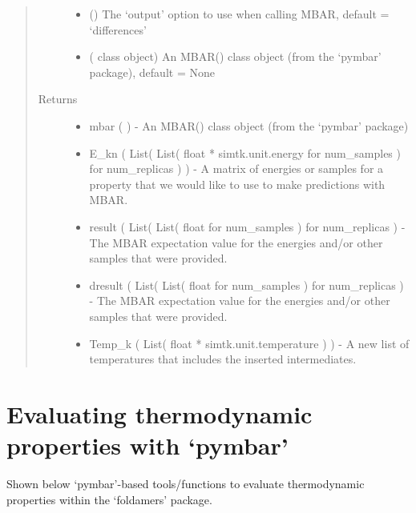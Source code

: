 \documentclass[letterpaper,12pt,english,openany,oneside]{sphinxmanual}
\begin{document}
\begin{fulllineitems}
\begin{quote}
\begin{description}
\begin{itemize}
\item {} 
 () \textendash{} The ‘output’ option to use when calling MBAR, default = ‘differences’

\item {} 
 ( class object) \textendash{} An MBAR() class object (from the ‘pymbar’ package), default = None

\end{itemize}

\item[{Returns}] \leavevmode
\begin{itemize}
\item {} 
mbar (  ) - An MBAR() class object (from the ‘pymbar’ package)

\end{itemize}
\begin{itemize}
\item {} 
E\_kn ( List( List( float * simtk.unit.energy for num\_samples ) for num\_replicas ) ) - A matrix of energies or samples for a property that we would like to use to make predictions with MBAR.

\item {} 
result ( List( List( float for num\_samples ) for num\_replicas ) - The MBAR expectation value for the energies and/or other samples that were provided.

\item {} 
dresult ( List( List( float for num\_samples ) for num\_replicas ) - The MBAR expectation value for the energies and/or other samples that were provided.

\item {} 
Temp\_k ( List( float * simtk.unit.temperature ) ) - A new list of temperatures that includes the inserted intermediates.

\end{itemize}


\end{description}\end{quote}

\end{fulllineitems}


\newpage


\section{Evaluating thermodynamic properties with ‘pymbar’}
\label{\detokenize{thermo:evaluating-thermodynamic-properties-with-pymbar}}
Shown below ‘pymbar’-based tools/functions to evaluate thermodynamic properties within the ‘foldamers’ package.
\end{document}
